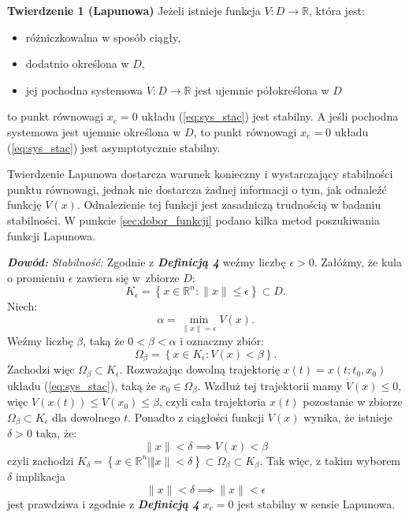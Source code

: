 \documentclass{article}
\begin{document}
\textbf{Twierdzenie 1 (Lapunowa)}
Jeżeli istnieje funkcja $V: D \rightarrow \mathbb{R}$, która jest:
\begin{itemize}
    \item różniczkowalna w sposób ciągły,
    \item dodatnio określona w $D$,
    \item jej pochodna systemowa $\dot{V}:D\rightarrow \mathbb{R}$ jest ujemnie półokreślona w $D$
\end{itemize}
to punkt równowagi $x_{e} = 0$ układu (\ref{eq:sys_stac}) jest stabilny.
A jeśli pochodna systemowa jest ujemnie określona w $D$, to punkt równowagi $x_{e} = 0$ układu (\ref{eq:sys_stac}) jest asymptotycznie stabilny.

\begin{tcolorbox}[colback=blue!5, colframe=blue!75!black, title=Ważne]
Twierdzenie Lapunowa dostarcza warunek konieczny i wystarczający stabilności punktu równowagi, jednak nie dostarcza żadnej informacji o tym, jak odnaleźć funkcję $V(x)$. Odnalezienie tej funkcji jest zasadniczą trudnością w badaniu stabilności.
W punkcie \ref{sec:dobor_funkcji} podano kilka metod poszukiwania funkcji Lapunowa.
\end{tcolorbox}

\textbf{\textit{Dowód:}}
\textit{Stabilność:}
Zgodnie z \textbf{\textit{Definicją 4}} weźmy liczbę $\epsilon > 0$.
Załóżmy, że kula o promieniu $\epsilon$ zawiera się w~zbiorze $D$:
$$
    K_{\epsilon} = \left\{ x\in \mathbb{R}^{n}: \lVert x \rVert \leq \epsilon \right\} \subset D.
$$
Niech:
$$
    \alpha = \min_{\lVert x \rVert = \epsilon }V(x).
$$
Weźmy liczbę $\beta$, taką że $0 < \beta < \alpha$ i oznaczmy zbiór:
$$
    \Omega_{\beta} = \left\{ x \in K_{\epsilon}: V(x) < \beta \right\}.
$$
Zachodzi więc $\Omega_{\beta} \subset K_{\epsilon}$.
Rozważając dowolną trajektorię $x(t) = x(t; t_{0}, x_{0})$ układu (\ref{eq:sys_stac}), taką że $x_{0} \in \Omega_{\beta}$.
Wzdłuż tej trajektorii mamy $\dot{V}(x) \leq 0$, więc $V(x(t)) \leq V(x_{0}) \leq \beta$, czyli cała trajektoria $x(t)$ pozostanie w zbiorze $\Omega_{\beta} \subset K_{\epsilon}$ dla dowolnego $t$.
Ponadto z ciągłości funkcji $V(x)$ wynika, że istnieje $\delta > 0$ taka, że:
$$
    \lVert x \rVert < \delta \implies V(x) < \beta
$$
czyli zachodzi $K_{\delta} = \left\{ x \in \mathbb{R}^{n}| \Vert x \rVert < \delta \right\} \subset \Omega_{\beta} \subset K_{\beta}$. Tak więc, z takim wyborem $\delta$ implikacja
$$
    \lVert x \rVert < \delta \implies \lVert x \rVert < \epsilon
$$
jest prawdziwa i zgodnie z \textbf{\textit{Definicją 4}} $x_{e} = 0$ jest stabilny w sensie Lapunowa.
\end{document}
